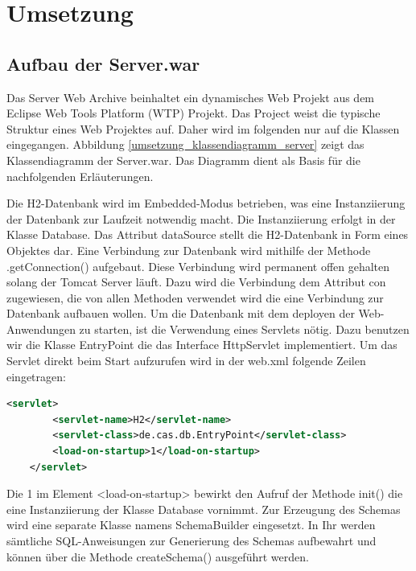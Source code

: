 

\chapter{Umsetzung}


\section{Aufbau der Server.war}

Das Server Web Archive beinhaltet ein dynamisches Web Projekt aus dem Eclipse Web Tools Platform (WTP) Projekt. Das Project weist die typische Struktur eines Web Projektes auf. Daher wird im folgenden nur auf die Klassen eingegangen. Abbildung \ref{umsetzung_klassendiagramm_server} zeigt das Klassendiagramm der Server.war. Das Diagramm dient als Basis für die nachfolgenden Erläuterungen. 

Die H2-Datenbank wird im Embedded-Modus betrieben, was eine Instanziierung der Datenbank zur Laufzeit notwendig macht. Die Instanziierung erfolgt in der Klasse Database. Das Attribut dataSource stellt die H2-Datenbank in Form eines Objektes dar. Eine Verbindung zur Datenbank wird mithilfe der Methode .getConnection() aufgebaut. Diese Verbindung wird permanent offen gehalten solang der Tomcat Server läuft. Dazu wird die Verbindung dem Attribut con zugewiesen, die von allen Methoden verwendet wird die eine Verbindung zur Datenbank aufbauen wollen. Um die Datenbank mit dem deployen der Web-Anwendungen zu starten, ist die Verwendung eines Servlets nötig. Dazu benutzen wir die Klasse EntryPoint die das Interface HttpServlet implementiert. Um das Servlet direkt beim Start aufzurufen wird in der web.xml folgende Zeilen eingetragen: 

\begin{lstlisting}[language=XML]
	<servlet>
		<servlet-name>H2</servlet-name>
		<servlet-class>de.cas.db.EntryPoint</servlet-class>
		<load-on-startup>1</load-on-startup>
	</servlet>
\end{lstlisting}

Die 1 im Element <load-on-startup> bewirkt den Aufruf der Methode init() die eine Instanziierung der Klasse Database vornimmt. Zur Erzeugung des Schemas wird eine separate Klasse namens SchemaBuilder eingesetzt. In Ihr werden sämtliche SQL-Anweisungen zur Generierung des Schemas aufbewahrt und können über die Methode createSchema() ausgeführt werden.

